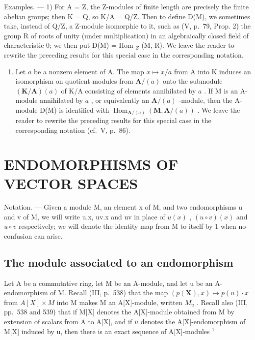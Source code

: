 Examples. --- 1) For A = Z, the Z-modules of finite length are precisely the finite abelian groups; then K = Q, so K/A = Q/Z. Then to define D(M), we sometimes take, instead of Q/Z, a Z-module isomorphic to it, such as (V, p.~79, Prop. 2) the group R of roots of unity (under multiplication) in an algebraically closed field of characteristic 0; we then put D(M) = Hom \(_{Z}\) (M, R). We leave the reader to rewrite the preceding results for this special case in the corresponding notation.

\begin{enumerate}
\def\labelenumi{\arabic{enumi})}
\setcounter{enumi}{1}
\tightlist
\item
  Let \(a\) be a nonzero element of A. The map \(x \mapsto x/a\) from A into K induces an isomorphism on quotient modules from \(\mathbf{A}/(a)\) onto the submodule \((\mathbf{K}/\mathbf{A})(a)\) of K/A consisting of elements annihilated by \(a\) . If M is an A-module annihilated by \(a\) , or equivalently an \(\mathbf{A}/(a)\) -module, then the A-module D(M) is identified with \(\operatorname{Hom}_{\mathbf{A}/(a)}(\mathbf{M}, \mathbf{A}/(a))\) . We leave the reader to rewrite the preceding results for this special case in the corresponding notation (cf.~V, p.~86).
\end{enumerate}

\section{ENDOMORPHISMS OF VECTOR SPACES}

Notation. --- Given a module M, an element x of M, and two endomorphisms u and v of M, we will write u.x, uv.x and uv in place of \(u(x)\) , \((u \circ v)(x)\) and \(u \circ v\) respectively; we will denote the identity map from M to itself by 1 when no confusion can arise.

\subsection{The module associated to an endomorphism}

Let A be a commutative ring, let M be an A-module, and let u be an A-endomorphism of M. Recall (III, p.~538) that the map \((p(\mathbf{X}), x) \mapsto p(u) \cdot x\) from \(A[X] \times M\) into M makes M an A{[}X{]}-module, written \(M_{u}\) . Recall also (III, pp.~538 and 539) that if M{[}X{]} denotes the A{[}X{]}-module obtained from M by extension of scalars from A to A{[}X{]}, and if \(\bar{u}\) denotes the A{[}X{]}-endomorphism of M{[}X{]} induced by u, then there is an exact sequence of A{[}X{]}-modules \(^{1}\)


